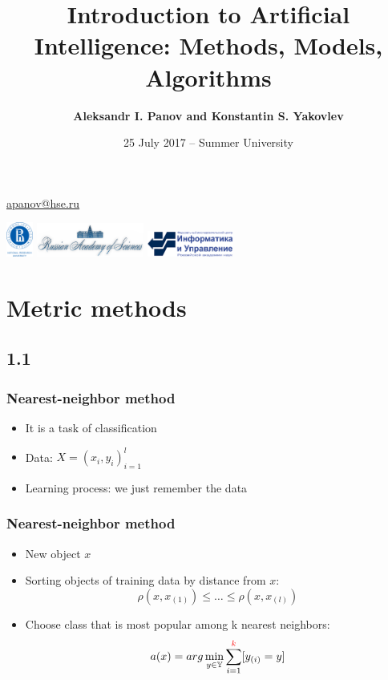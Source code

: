 \documentclass[default]{beamer}
\begin{document}
	
	\title[Introduction to AI]{Introduction to Artificial Intelligence: Methods, Models, Algorithms}
	\author[Panov]{\textbf{Aleksandr I. Panov and Konstantin S. Yakovlev}}
	\date{25 July 2017 -- Summer University} 
	
	{
	\begin{frame}
		
		\titlepage
		\centering
		\href{mailto:apanov@hse.ru}{apanov@hse.ru}
		
		\includegraphics[width=25pt]{hse.png} \hspace{10pt}
		\includegraphics[width=100pt]{ras_en.png} \hspace{10pt}
		\includegraphics[width=80pt]{frccsc.png}
		
	\end{frame}
	}	

	\section{Metric methods}
	\subsection{1.1}
	\begin{frame}
		\frametitle{Nearest-neighbor method}

		\begin{itemize}
			\item It is a task of classification
			\item Data: $X=(x_i, y_i)^l_{i=1}$
			\item Learning process: we just remember the data
		\end{itemize}
	\end{frame}

	\begin{frame}
		\frametitle{Nearest-neighbor method}
		
		\begin{itemize}
			\item New object $x$
			\item Sorting objects of training data by distance from $x$:
				\[
					\rho(x,x_{(1)})\leq \dots \leq \rho(x, x_{(l)})
				\]
			\item Choose class that is most popular among k nearest neighbors:
			\[
				a(x)=arg\min_{y\in\mathbb Y}\sum_{i=1}^{\textcolor{red}{k}}[y_{(i)}=y]
			\]
				
		\end{itemize}
	\end{frame}
\end{document}

